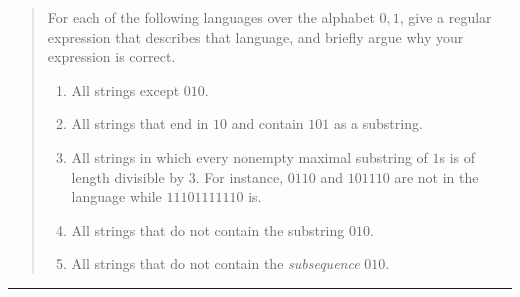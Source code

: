 \documentclass[11pt]{article}
\begin{document}



\begin{quote}
    For each of the following languages over the alphabet ${0,1}$, give a regular expression that describes that language, and briefly argue why your expression is correct.
    \begin{enumerate}
        \item All strings except $010$.
        \item All strings that end in $10$ and contain $101$ as a substring.
        \item All strings in which every nonempty maximal substring of $1$s is of length divisible by 3. For instance, $0110$ and $101110$ are not in the language while $11101111110$ is.
        \item All strings that do not contain the substring $010$.
        \item All strings that do not contain the \textit{subsequence} $010$.
    \end{enumerate}
\end{quote}
\hrule



\begin{solution}
    \begin{enumerate}
    \end{enumerate}
\end{solution}
\end{document}
